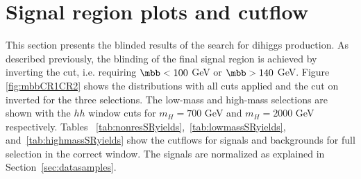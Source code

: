 \section{Signal region plots and cutflow}
\label{sec:plots_cut_flow}
This section presents the blinded results of the search for dihiggs production. As described previously, the blinding of the final signal region is achieved by inverting the \mbb cut, i.e. requiring $\mbb < 100$ GeV or $\mbb > 140$ GeV. Figure \ref{fig:mbbCR1CR2} shows the \mbb distributions with all cuts applied and the cut on \mbb inverted for the three selections. The low-mass and high-mass selections are shown with the $hh$ window cuts for $m_H=700$ GeV and $m_H=2000$ GeV respectively. Tables ~\ref{tab:nonresSRyields},~\ref{tab:lowmassSRyields}, and~\ref{tab:highmassSRyields} show the cutflows for signals and backgrounds for full selection in the correct \mbb window. The signals are normalized as explained in Section~\ref{sec:datasamples}. 

